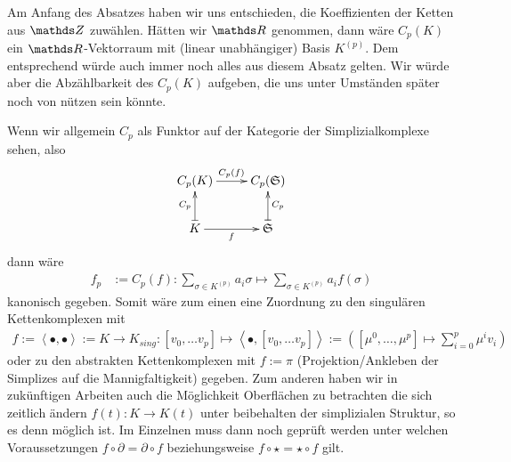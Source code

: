     
  \begin{fazit}
    Am Anfang des Absatzes haben wir uns entschieden, die Koeffizienten der Ketten aus \( \Z \) zuwählen.
    Hätten wir \( \R \) genommen, dann wäre \( C_{p}(K) \) ein \( \R \)-Vektorraum mit (linear unabhängiger) Basis \( K^{(p)} \).
    Dem entsprechend würde auch immer noch alles aus diesem Absatz gelten.
    Wir würde aber die Abzählbarkeit des \( C_{p}(K) \) aufgeben, die uns unter Umständen später noch von nützen sein könnte.

    Wenn wir allgemein \( C_{p} \) als Funktor auf der Kategorie der Simplizialkomplexe sehen, also
    \begin{align}
      \begin{xy}
        \xymatrix{
          C_{p}(K) \ar[r]^{C_{p}(f)} & C_{p}(\mathfrak{S}) \\
          K \ar@{|->}[u]^{C_{p}} \ar[r]_{f} & \mathfrak{S} \ar@{|->}[u]_{C_{p}}
        }
      \end{xy}
    \end{align}
    dann wäre
    \begin{align}
      f_{p} &:= C_{p}(f): \sum_{\sigma\in K^{(p)}} a_{i}\sigma \mapsto \sum_{\sigma\in K^{(p)}} a_{i}f(\sigma)
    \end{align}
    kanonisch gegeben. 
    Somit wäre zum einen eine Zuordnung zu den singulären Kettenkomplexen mit 
    \begin{align}
      f := \left\langle \bullet, \bullet \right\rangle := K \rightarrow K_{sing} 
                                                           : \left[ v_{0},\ldots v_{p}\right] \mapsto \left\langle \bullet , \left[ v_{0},\ldots v_{p}\right] \right\rangle
                                                           := \left( \left[ \mu^{0},\ldots,\mu^{p} \right] \mapsto \sum_{i=0}^{p} \mu^{i} v_{i}\right)
    \end{align}
    oder zu den abstrakten Kettenkomplexen mit \( f:=\pi \) (Projektion/Ankleben der Simplizes auf die Mannigfaltigkeit) gegeben.
    Zum anderen haben wir in zukünftigen Arbeiten auch die Möglichkeit Oberflächen zu betrachten die sich zeitlich ändern 
     \( f(t):K\rightarrow K(t) \) unter beibehalten der simplizialen Struktur, so es denn möglich ist.
    Im Einzelnen muss dann noch geprüft werden unter welchen Voraussetzungen \( f\circ\partial = \partial\circ f\) beziehungsweise \( f\circ\star = \star\circ f\) gilt.
  \end{fazit}
  




